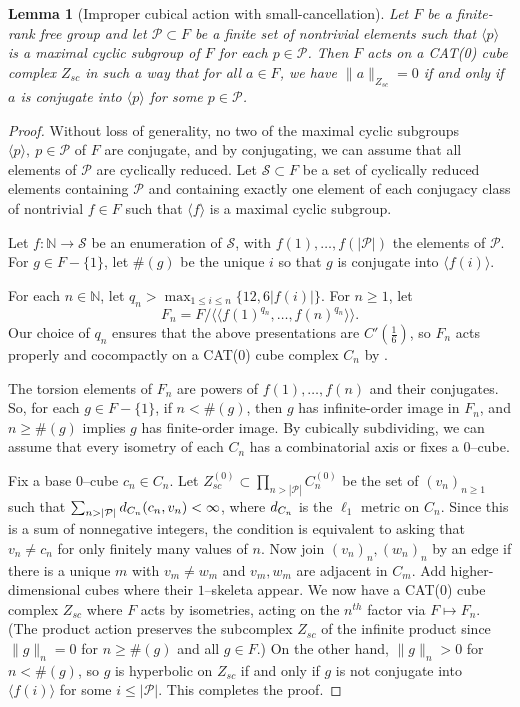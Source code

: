 \documentclass[11pt,oneside]{amsart}
\newcounter{ax}
\newtheorem{lem}[thm]{Lemma}
\theoremstyle{definition}
\newcommand{\field}[1]{\mathbb{#1}}
\newcommand{\naturals}{\ensuremath{\field{N}}}
\newcommand{\dist}{\textup{\textsf{d}}}
\begin{document}
\begin{lem}[Improper cubical action with small-cancellation]\label{lem:small-cancellation-improper}
Let $F$ be a finite-rank free group and let $\mathcal P\subset F$ be a finite set of nontrivial elements such that $\langle p\rangle$ is a maximal cyclic subgroup of $F$ for each $p\in\mathcal P$.  Then $F$ acts on a CAT(0) cube complex $Z_{sc}$ in such a way that for all $a\in F$, we have $\|a\|_{Z_{sc}}=0$ if and only if $a$ is conjugate into $\langle p\rangle$ for some $p\in\mathcal P$.
\end{lem}

\begin{proof}
Without loss of generality, no two of the maximal cyclic subgroups $\langle p\rangle,\ p\in \mathcal P$ of $F$ are conjugate, and by conjugating, we can assume that all elements of $\mathcal P$ are cyclically reduced.  Let $\mathcal S\subset F$ be a set of cyclically reduced elements containing $\mathcal P$ and containing exactly one element of each conjugacy class of nontrivial $f\in F$ such that $\langle f\rangle$ is a maximal cyclic subgroup.

Let $f:\naturals\to \mathcal S$ be an enumeration of $\mathcal S$, with $f(1),\ldots,f(|\mathcal P|)$ the elements of $\mathcal P$.  For $g\in F-\{1\}$, let $\#(g)$ be the unique $i$ so that $g$ is conjugate into $\langle f(i)\rangle$.  

For each $n\in\naturals$, let $q_n>\max_{1\leq i\leq n}\{12, 6|f(i)|\}$.  For $n\geq 1$, let $$F_n=F/\langle\langle f(1)^{q_n},\ldots,f(n)^{q_n}\rangle\rangle.$$
Our choice of $q_n$ ensures that the above presentations are $C'(\frac16)$, so $F_n$ acts properly and cocompactly on a CAT(0) cube complex $C_n$ by \cite[Thm. 1.2]{Wise:small-cancellation}.  

The torsion elements of $F_n$ are powers of $f(1),\ldots,f(n)$ and their conjugates.  So, for each $g\in F-\{1\}$, if $n<\#(g)$, then $g$ has infinite-order image in $F_n$, and $n\geq \#(g)$ implies $g$ has finite-order image.  By cubically subdividing, we can assume that every isometry of each $C_n$ has a combinatorial axis or fixes a $0$--cube.

Fix a base $0$--cube $c_n\in C_n$.  Let $Z_{sc}^{(0)}\subset \prod_{n> |\mathcal P|}C_n^{(0)}$ be the set of $(v_n)_{n\geq 1}$ such that $\sum_{n> |\mathcal P|}\dist_{C_n}(c_n,v_n)<\infty$, where $\dist_{C_n}$ is the $\ell_1$ metric on $C_n$.  Since this is a sum of nonnegative integers, the condition is equivalent to asking that $v_n\neq c_n$ for only finitely many values of $n$.  Now join $(v_n)_n,(w_n)_n$ by an edge if there is a unique $m$ with $v_m\neq w_m$ and $v_m,w_m$ are adjacent in $C_m$.  Add higher-dimensional cubes where their $1$--skeleta appear.  We now have a CAT(0) cube complex $Z_{sc}$ where $F$ acts by isometries, acting on the $n^{th}$ factor via $F\mapsto F_n$.  (The product action preserves the subcomplex $Z_{sc}$ of the infinite product since $\|g\|_n=0$ for $n\geq \#(g)$ and all $g\in F$.)  On the other hand, $\|g\|_n>0$ for $n<\#(g)$, so $g$ is hyperbolic on $Z_{sc}$ if and only if $g$ is not conjugate into $\langle f(i)\rangle$ for some $i\leq |\mathcal P|$.  This completes the proof.
\end{proof}
\end{document}

